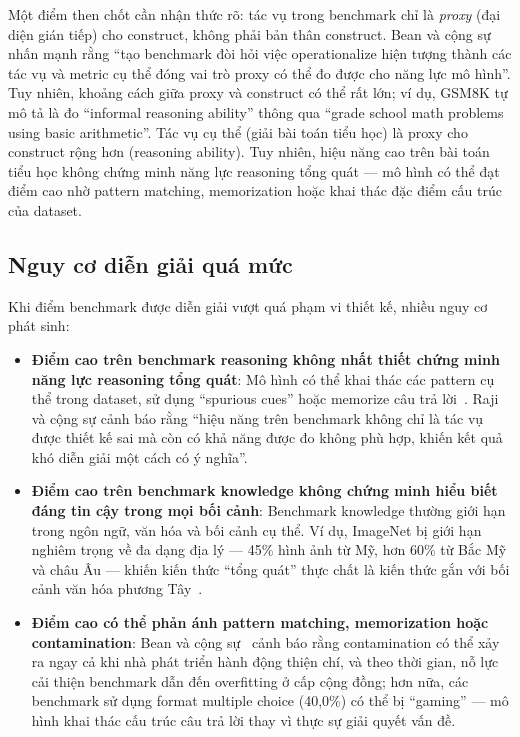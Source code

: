 Một điểm then chốt cần nhận thức rõ: tác vụ trong benchmark chỉ là \textit{proxy} (đại diện gián tiếp) cho construct, không phải bản thân construct. Bean và cộng sự~\cite{measuring_what_matters} nhấn mạnh rằng ``tạo benchmark đòi hỏi việc operationalize hiện tượng thành các tác vụ và metric cụ thể đóng vai trò proxy có thể đo được cho năng lực mô hình''. Tuy nhiên, khoảng cách giữa proxy và construct có thể rất lớn; ví dụ, GSM8K tự mô tả là đo ``informal reasoning ability'' thông qua ``grade school math problems using basic arithmetic''. Tác vụ cụ thể (giải bài toán tiểu học) là proxy cho construct rộng hơn (reasoning ability). Tuy nhiên, hiệu năng cao trên bài toán tiểu học không chứng minh năng lực reasoning tổng quát --- mô hình có thể đạt điểm cao nhờ pattern matching, memorization hoặc khai thác đặc điểm cấu trúc của dataset.

\subsection{Nguy cơ diễn giải quá mức}
\label{sec:overinterpretation}

Khi điểm benchmark được diễn giải vượt quá phạm vi thiết kế, nhiều nguy cơ phát sinh:

\begin{itemize}
    \item \textbf{Điểm cao trên benchmark reasoning không nhất thiết chứng minh năng lực reasoning tổng quát}: Mô hình có thể khai thác các pattern cụ thể trong dataset, sử dụng ``spurious cues'' hoặc memorize câu trả lời~\cite{everything_benchmark, measuring_what_matters}. Raji và cộng sự cảnh báo rằng ``hiệu năng trên benchmark không chỉ là tác vụ được thiết kế sai mà còn có khả năng được đo không phù hợp, khiến kết quả khó diễn giải một cách có ý nghĩa''.
    
    \item \textbf{Điểm cao trên benchmark knowledge không chứng minh hiểu biết đáng tin cậy trong mọi bối cảnh}: Benchmark knowledge thường giới hạn trong ngôn ngữ, văn hóa và bối cảnh cụ thể. Ví dụ, ImageNet bị giới hạn nghiêm trọng về đa dạng địa lý --- 45\% hình ảnh từ Mỹ, hơn 60\% từ Bắc Mỹ và châu Âu --- khiến kiến thức ``tổng quát'' thực chất là kiến thức gắn với bối cảnh văn hóa phương Tây~\cite{everything_benchmark}.

    \item \textbf{Điểm cao có thể phản ánh pattern matching, memorization hoặc contamination}: Bean và cộng sự~\cite{measuring_what_matters} cảnh báo rằng contamination có thể xảy ra ngay cả khi nhà phát triển hành động thiện chí, và theo thời gian, nỗ lực cải thiện benchmark dẫn đến overfitting ở cấp cộng đồng; hơn nữa, các benchmark sử dụng format multiple choice (40,0\%) có thể bị ``gaming'' --- mô hình khai thác cấu trúc câu trả lời thay vì thực sự giải quyết vấn đề.
\end{itemize}

